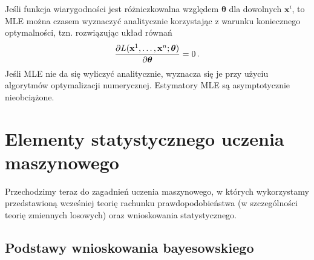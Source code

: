 \documentclass{myclass}
\numberwithin{equation}{section}
\begin{document}
Jeśli funkcja wiarygodności jest różniczkowalna względem \(\boldsymbol{\theta}\) dla dowolnych
\(\mathbf{x}^i\), to MLE można czasem wyznaczyć analitycznie korzystając z warunku koniecznego
optymalności, tzn. rozwiązując układ równań
\begin{equation}
    \pdv{L(\mathbf{x}^1,\ldots,\mathbf{x}^n; \boldsymbol{\theta})}{\boldsymbol{\theta}} = 0\,.
\end{equation}
Jeśli MLE nie da się wyliczyć analitycznie, wyznacza się je przy użyciu algorytmów optymalizacji
numerycznej. Estymatory MLE są asymptotycznie nieobciążone.


\section{Elementy statystycznego uczenia maszynowego}

Przechodzimy teraz do zagadnień uczenia maszynowego, w których wykorzystamy przedstawioną wcześniej
teorię rachunku prawdopodobieństwa (w szczególności teorię zmiennych losowych) oraz wnioskowania
statystycznego.


\subsection{Podstawy wnioskowania bayesowskiego}
\end{document}
